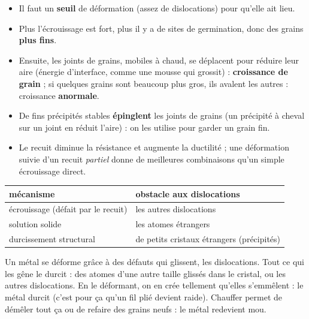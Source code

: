 
\begin{propbox}[title={Ce qu'il faut savoir de la recristallisation}]
\begin{itemize}
  \item Il faut un \textbf{seuil} de déformation (assez de dislocations) pour qu'elle ait lieu.
  \item Plus l'écrouissage est fort, plus il y a de sites de germination, donc des grains
        \textbf{plus fins}.
  \item Ensuite, les joints de grains, mobiles à chaud, se déplacent pour réduire leur aire
        (énergie d'interface, comme une mousse qui grossit) : \textbf{croissance de grain} ; si
        quelques grains sont beaucoup plus gros, ils avalent les autres : croissance
        \textbf{anormale}.
  \item De fins précipités stables \textbf{épinglent} les joints de grains (un précipité à
        cheval sur un joint en réduit l'aire) : on les utilise pour garder un grain fin.
  \item Le recuit diminue la résistance et augmente la ductilité ; une déformation suivie d'un
        recuit \emph{partiel} donne de meilleures combinaisons qu'un simple écrouissage direct.
\end{itemize}
\end{propbox}

\begin{keybox}[title=Bilan : trois mécanismes de durcissement]
\begin{center}
\renewcommand{\arraystretch}{1.3}
\begin{tabular}{l|l}
mécanisme & obstacle aux dislocations \\ \hline
écrouissage (défait par le recuit) & les autres dislocations \\
solution solide & les atomes étrangers \\
durcissement structural & de petits cristaux étrangers (précipités) \\
\end{tabular}
\end{center}
\end{keybox}

\begin{goatbox}
Un métal se déforme grâce à des défauts qui glissent, les dislocations. Tout ce qui les gêne le
durcit : des atomes d'une autre taille glissés dans le cristal, ou les autres dislocations. En le
déformant, on en crée tellement qu'elles s'emmêlent : le métal durcit (c'est pour ça qu'un fil
plié devient raide). Chauffer permet de démêler tout ça ou de refaire des grains neufs : le métal
redevient mou.
\end{goatbox}

